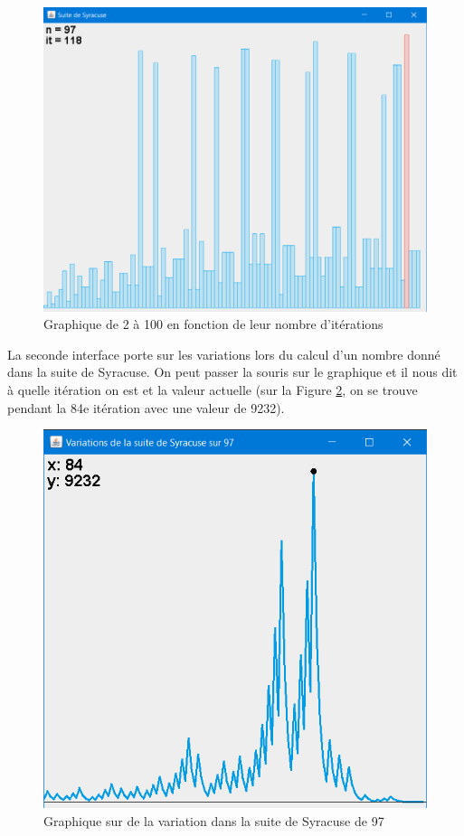 \begin{figure}[H]
\includegraphics[scale=0.5]{images/syracuse_100.PNG}
\centering
\caption{Graphique de 2 à 100 en fonction de leur nombre d'itérations}
\label{syra100}
\end{figure}

La seconde interface porte sur les variations lors du calcul d'un nombre donné dans la suite de Syracuse. On peut passer la souris sur le graphique et il nous dit à quelle itération on est et la valeur actuelle (sur la Figure \ref{syra97}, on se trouve pendant la 84e itération avec une valeur de 9232).

\begin{figure}[H]
\includegraphics[scale=0.6]{images/syracuse_var_97.PNG}
\centering
\caption{Graphique sur de la variation dans la suite de Syracuse de 97}
\label{syra97}
\end{figure}


